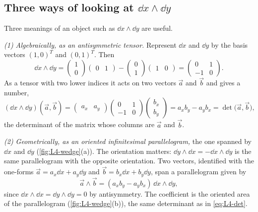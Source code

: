 \subsection{Three ways of looking at \texorpdfstring{$\dd x\wedge\dd y$}{dx\textwedge dy}}

Three meanings of an object such as $\dd x\wedge\dd y$ are useful.

\emph{(1) Algebraically, as an antisymmetric tensor.} Represent $\dd x$ and $\dd y$ by the basis vectors $(1,0)^T$ and $(0,1)^T$. Then
\begin{equation}
  \dd x\wedge\dd y = \begin{pmatrix}1\\0\end{pmatrix}\begin{pmatrix}0&1\end{pmatrix} - \begin{pmatrix}0\\1\end{pmatrix}\begin{pmatrix}1&0\end{pmatrix}
  = \begin{pmatrix}0&1\\-1&0\end{pmatrix} .
  \label{eq:L4-matrix}
\end{equation}
As a tensor with two lower indices it acts on two vectors $\vec a$ and $\vec b$ and gives a number,
\begin{equation}
  (\dd x\wedge\dd y)(\vec a,\vec b) = \begin{pmatrix}a_x&a_y\end{pmatrix}\begin{pmatrix}0&1\\-1&0\end{pmatrix}\begin{pmatrix}b_x\\b_y\end{pmatrix}
  = a_xb_y - a_yb_x = \det\bigl(\vec a,\vec b\bigr) ,
  \label{eq:L4-det}
\end{equation}
the determinant of the matrix whose columns are $\vec a$ and $\vec b$.

\emph{(2) Geometrically, as an oriented infinitesimal parallelogram,} the one spanned by $\dd x$ and $\dd y$ (\cref{fig:L4-wedge}(a)). The orientation matters: $\dd y\wedge\dd x = -\dd x\wedge\dd y$ is the same parallelogram with the opposite orientation. Two vectors, identified with the one-forms $\vec a = a_x\dd x + a_y\dd y$ and $\vec b = b_x\dd x + b_y\dd y$, span a parallelogram given by
\begin{equation}
  \vec a\wedge\vec b = (a_xb_y - a_yb_x)\,\dd x\wedge\dd y ,
  \label{eq:L4-parallelogram}
\end{equation}
since $\dd x\wedge\dd x = \dd y\wedge\dd y = 0$ by antisymmetry. The coefficient is the oriented area of the parallelogram (\cref{fig:L4-wedge}(b)), the same determinant as in \cref{eq:L4-det}.

